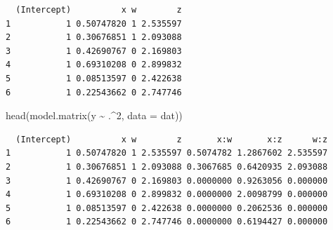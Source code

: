 \documentclass[
  11pt,
]{krantz}
\newenvironment{Shaded}{\begin{snugshade}}{\end{snugshade}}
\newcommand{\AttributeTok}[1]{\textcolor[rgb]{0.61,0.61,0.61}{#1}}
\newcommand{\CommentTok}[1]{\textcolor[rgb]{0.37,0.37,0.37}{\textit{#1}}}
\newcommand{\DecValTok}[1]{\textcolor[rgb]{0.06,0.06,0.06}{#1}}
\newcommand{\FunctionTok}[1]{\textcolor[rgb]{0,0,0}{#1}}
\newcommand{\NormalTok}[1]{#1}
\newcommand{\OtherTok}[1]{\textcolor[rgb]{0.37,0.37,0.37}{#1}}
\newcommand{\SpecialCharTok}[1]{\textcolor[rgb]{0,0,0}{#1}}
\newcommand{\StringTok}[1]{\textcolor[rgb]{0.5,0.5,0.5}{#1}}
\begin{document}
\begin{verbatim}
  (Intercept)          x w        z
1           1 0.50747820 1 2.535597
2           1 0.30676851 1 2.093088
3           1 0.42690767 0 2.169803
4           1 0.69310208 0 2.899832
5           1 0.08513597 0 2.422638
6           1 0.22543662 0 2.747746
\end{verbatim}

\begin{Shaded}
\begin{Highlighting}[]
\FunctionTok{head}\NormalTok{(}\FunctionTok{model.matrix}\NormalTok{(y }\SpecialCharTok{\textasciitilde{}}\NormalTok{ .}\SpecialCharTok{\^{}}\DecValTok{2}\NormalTok{, }\AttributeTok{data =}\NormalTok{ dat))}
\end{Highlighting}
\end{Shaded}

\begin{verbatim}
  (Intercept)          x w        z       x:w       x:z      w:z
1           1 0.50747820 1 2.535597 0.5074782 1.2867602 2.535597
2           1 0.30676851 1 2.093088 0.3067685 0.6420935 2.093088
3           1 0.42690767 0 2.169803 0.0000000 0.9263056 0.000000
4           1 0.69310208 0 2.899832 0.0000000 2.0098799 0.000000
5           1 0.08513597 0 2.422638 0.0000000 0.2062536 0.000000
6           1 0.22543662 0 2.747746 0.0000000 0.6194427 0.000000
\end{verbatim}

\begin{Shaded}
\end{Shaded}
\end{document}
